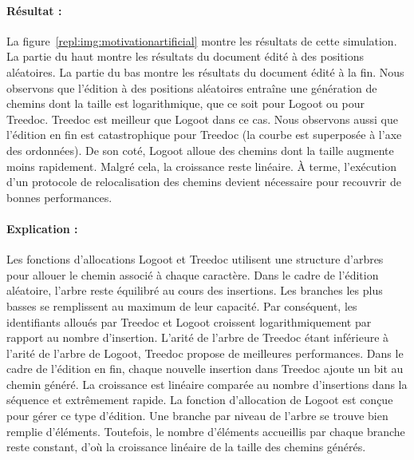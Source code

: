 \paragraph{Résultat :} La figure~\ref{repl:img:motivationartificial} montre les
résultats de cette simulation. La partie du haut montre les résultats du
document édité à des positions aléatoires. La partie du bas montre les résultats
du document édité à la fin. Nous observons que l'édition à des positions
aléatoires entraîne une génération de chemins dont la taille est logarithmique,
que ce soit pour Logoot ou pour Treedoc. Treedoc est meilleur que Logoot dans ce
cas. Nous observons aussi que l'édition en fin est catastrophique pour Treedoc
(la courbe est superposée à l'axe des ordonnées). De son coté, Logoot alloue des
chemins dont la taille augmente moins rapidement. Malgré cela, la croissance
reste linéaire. À terme, l'exécution d'un protocole de relocalisation des
chemins devient nécessaire pour recouvrir de bonnes performances.

\paragraph{Explication :} Les fonctions d'allocations Logoot et Treedoc
utilisent une structure d'arbres pour allouer le chemin associé à chaque
caractère. Dans le cadre de l'édition aléatoire, l'arbre reste équilibré au
cours des insertions. Les branches les plus basses se remplissent au maximum de
leur capacité. Par conséquent, les identifiants alloués par Treedoc et Logoot
croissent logarithmiquement par rapport au nombre d'insertion. L'arité de
l'arbre de Treedoc étant inférieure à l'arité de l'arbre de Logoot, Treedoc
propose de meilleures performances. Dans le cadre de l'édition en fin, chaque
nouvelle insertion dans Treedoc ajoute un bit au chemin généré. La croissance
est linéaire comparée au nombre d'insertions dans la séquence et extrêmement
rapide. La fonction d'allocation de Logoot est conçue pour gérer ce type
d'édition. Une branche par niveau de l'arbre se trouve bien remplie
d'éléments. Toutefois, le nombre d'éléments accueillis par chaque branche reste
constant, d'où la croissance linéaire de la taille des chemins générés.


